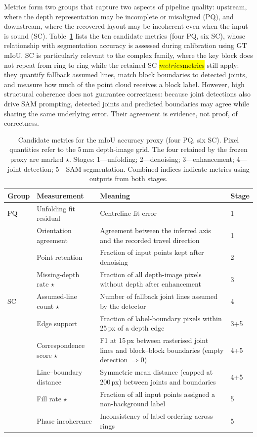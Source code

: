 \documentclass[a4paper,fleqn]{cas-dc}
\let\texthl\hl
\renewcommand{\hl}[1]{\ifmmode\colorbox{yellow}{\ensuremath{#1}}\else\texthl{#1}\fi}
\begin{document}
Metrics form two groups that capture two aspects of pipeline quality: upstream, where the depth representation may be incomplete or misaligned (PQ), and downstream, where the recovered layout may be incoherent even when the input is sound (SC). Table~\ref{tab:candidate-metrics} lists the ten candidate metrics (four PQ, six SC), whose relationship with segmentation accuracy is assessed during calibration using GT mIoU. SC is particularly relevant to the complex family, where the key block does not repeat from ring to ring while the retained SC \hl{metrics} still apply: they quantify fallback assumed lines, match block boundaries to detected joints, and measure how much of the point cloud receives a block label. However, high structural coherence does not guarantee correctness: because joint detections also drive SAM prompting, detected joints and predicted boundaries may agree while sharing the same underlying error. Their agreement is evidence, not proof, of correctness.

\begin{table}[t]
\caption{Candidate metrics for the mIoU accuracy proxy (four PQ, six SC). Pixel quantities refer to the 5\,mm depth-image grid. The four retained by the frozen proxy are marked $\star$. Stages: 1---unfolding; 2---denoising; 3---enhancement; 4---joint detection; 5---SAM segmentation. Combined indices indicate metrics using outputs from both stages.}
\label{tab:candidate-metrics}
\centering
\small
\setlength{\tabcolsep}{3pt}
\begin{tabular}{p{} p{} p{} p{}}
\toprule
Group & Measurement & Meaning & Stage \\
\midrule
PQ & Unfolding fit residual & Centreline fit error & 1 \\
 & Orientation agreement & Agreement between the inferred axis and the recorded travel direction & 1 \\
 & Point retention & Fraction of input points kept after denoising & 2 \\
 & Missing-depth rate $\star$ & Fraction of all depth-image pixels without depth after enhancement & 3 \\
SC & Assumed-line count $\star$ & Number of fallback joint lines assumed by the
detector & 4 \\
 & Edge support & Fraction of label-boundary pixels within 25\,px of a depth edge & 3+5 \\
 & Correspondence score $\star$ & F1 at 15\,px between rasterised joint lines and block--block boundaries (empty detection $\Rightarrow 0$) & 4+5 \\
 & Line--boundary distance & Symmetric mean distance (capped at 200\,px) between joints and boundaries & 4+5 \\
 & Fill rate $\star$ & Fraction of all input points assigned a non-background label & 5 \\
 & Phase incoherence & Inconsistency of label ordering across rings & 5 \\
\bottomrule
\end{tabular}
\end{table}
\end{document}
